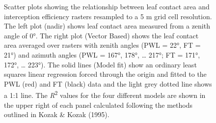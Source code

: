 \documentclass[
  letterpaper,
  DIV=11,
  numbers=noendperiod]{scrartcl}
\begin{document}
\begin{figure}


\caption{\label{fig-lca-vs-ip}Scatter plots showing the relationship
between leaf contact area and interception efficiency rasters resampled
to a 5 m grid cell resolution. The left plot (nadir) shows leaf contact
area measured from a zenith angle of 0°. The right plot (Vector Based)
shows the leaf contact area averaged over rasters with zenith angles
(PWL = 22°, FT = 21°) and azimuth angles (PWL = 167°, 178°, \ldots{}
217°; FT = 171°, 172°, \ldots{} 223°). The solid lines (Model fit) show
an ordinary least squares linear regression forced through the origin
and fitted to the PWL (red) and FT (black) data and the light grey
dotted line shows a 1:1 line. The \emph{R}\textsuperscript{2} values for
the four different models are shown in the upper right of each panel
calculated following the methods outlined in Kozak \& Kozak (1995).}

\end{figure}%
\end{document}
